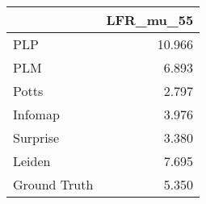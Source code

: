 \begin{tabular}{lr}
\toprule
{} & LFR_mu_55 \\
\midrule
PLP          &    10.966 \\
PLM          &     6.893 \\
Potts        &     2.797 \\
Infomap      &     3.976 \\
Surprise     &     3.380 \\
Leiden       &     7.695 \\
Ground Truth &     5.350 \\
\bottomrule
\end{tabular}
